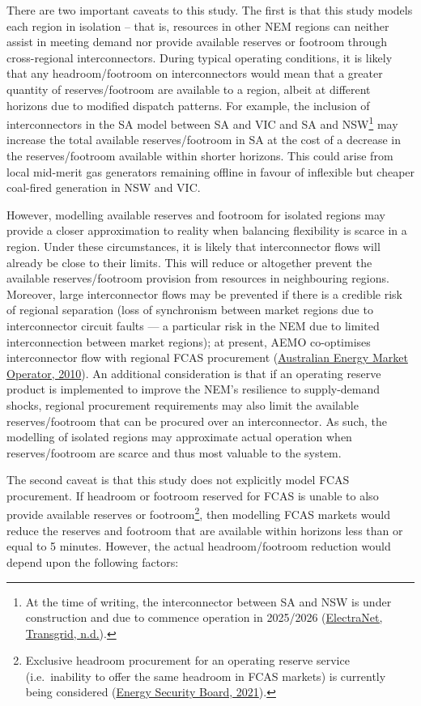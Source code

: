 \documentclass[12pt,a4paper,]{report}
\begin{document}
There are two important caveats to this study. The first is that this
study models each region in isolation -- that is, resources in other NEM
regions can neither assist in meeting demand nor provide available
reserves or footroom through cross-regional interconnectors. During
typical operating conditions, it is likely that any headroom/footroom on
interconnectors would mean that a greater quantity of reserves/footroom
are available to a region, albeit at different horizons due to modified
dispatch patterns. For example, the inclusion of interconnectors in the
SA model between SA and VIC and SA and NSW\footnote{At the time of
  writing, the interconnector between SA and NSW is under construction
  and due to commence operation in 2025/2026
  (\protect\hyperlink{ref-electranettransgridProjectEnergyConnect}{ElectraNet,
  Transgrid, n.d.}).} may increase the total available reserves/footroom
in SA at the cost of a decrease in the reserves/footroom available
within shorter horizons. This could arise from local mid-merit gas
generators remaining offline in favour of inflexible but cheaper
coal-fired generation in NSW and VIC.

However, modelling available reserves and footroom for isolated regions
may provide a closer approximation to reality when balancing flexibility
is scarce in a region. Under these circumstances, it is likely that
interconnector flows will already be close to their limits. This will
reduce or altogether prevent the available reserves/footroom provision
from resources in neighbouring regions. Moreover, large interconnector
flows may be prevented if there is a credible risk of regional
separation (loss of synchronism between market regions due to
interconnector circuit faults --- a particular risk in the NEM due to
limited interconnection between market regions); at present, AEMO
co-optimises interconnector flow with regional FCAS procurement
(\protect\hyperlink{ref-australianenergymarketoperatorConstraintFormulationGuidelines2010}{Australian
Energy Market Operator, 2010}). An additional consideration is that if
an operating reserve product is implemented to improve the NEM's
resilience to supply-demand shocks, regional procurement requirements
may also limit the available reserves/footroom that can be procured over
an interconnector. As such, the modelling of isolated regions may
approximate actual operation when reserves/footroom are scarce and thus
most valuable to the system.

The second caveat is that this study does not explicitly model FCAS
procurement. If headroom or footroom reserved for FCAS is unable to also
provide available reserves or footroom\footnote{Exclusive headroom
  procurement for an operating reserve service (i.e.~inability to offer
  the same headroom in FCAS markets) is currently being considered
  (\protect\hyperlink{ref-energysecurityboardPost2025Market2021}{Energy
  Security Board, 2021}).}, then modelling FCAS markets would reduce the
reserves and footroom that are available within horizons less than or
equal to 5 minutes. However, the actual headroom/footroom reduction
would depend upon the following factors:
\end{document}
